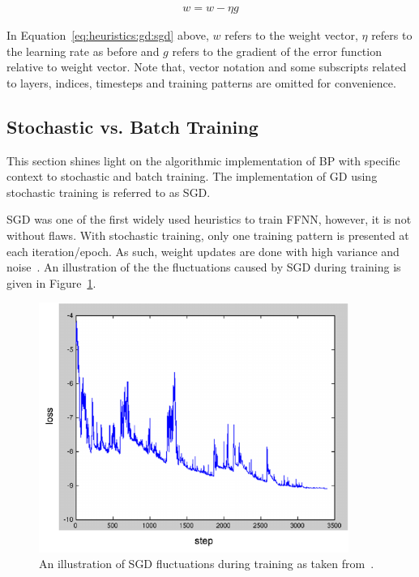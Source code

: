 \begin{equation}
      \label{eq:heuristics:gd:sgd}
      \begin{split}
            w = w - \eta g
      \end{split}
\end{equation}

\noindent
In Equation~\eqref{eq:heuristics:gd:sgd} above, $w$ refers to the weight vector, $\eta$ refers to the learning rate as before and $g$ refers to the gradient of the error function relative to weight vector. Note that, vector notation and some subscripts related to layers, indices, timesteps and training patterns are omitted for convenience.

\subsection{Stochastic vs. Batch Training}\label{sec:heuristics:gd:sgd}

This section shines light on the algorithmic implementation of \acs{BP} with specific context to stochastic and batch training. The implementation of \acs{GD} using stochastic training is referred to as \acf{SGD}.

\acs{SGD} was one of the first widely used heuristics to train \acs{FFNN}, however, it is not without flaws. With stochastic training, only one training pattern is presented at each iteration/epoch. As such, weight updates are done with high variance and noise~\cite{ref:ruder:2016}. An illustration of the the fluctuations caused by \acs{SGD} during training is given in Figure~\ref{fig:heuristics:gd:sgd}.

\begin{figure}[htbp]
      \centering
      \includegraphics[width=0.9\textwidth]{images/sgd.pdf}
      \caption{An illustration of \acf{SGD} fluctuations during training as taken from~\cite{ref:sgd:2006}.}
      \label{fig:heuristics:gd:sgd}
\end{figure}

